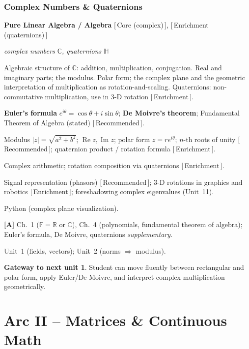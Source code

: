 \documentclass[11pt]{article}
\newcommand{\dom}[1]{{\sffamily\bfseries\color{RoyalBlue}#1}}
\newcommand{\pri}[1]{{\footnotesize\sffamily\color{BrickRed}[\,#1\,]}}
\newcommand{\obj}[1]{{\itshape #1}}
\newenvironment{unitfields}
  {\begin{description}[leftmargin=0pt,labelindent=0pt,style=nextline,
      font=\normalfont\sffamily\bfseries\color{RoyalBlue},itemsep=3pt,topsep=4pt]}
  {\end{description}}
\newcommand{\ff}[1]{\item[#1]}
\theoremstyle{definition}
\newtheorem*{gateway}{Gateway to next unit}
\begin{document}
\section{Complex Numbers \& Quaternions}
\begin{unitfields}
\ff{Domain(s)} \dom{Pure Linear Algebra / Algebra} \pri{Core (complex)}, \pri{Enrichment (quaternions)}
\ff{Primary object(s)} \obj{complex numbers $\mathbb{C}$, quaternions $\mathbb{H}$}
\ff{Topics}
  Algebraic structure of $\mathbb{C}$: addition, multiplication, conjugation.
  Real and imaginary parts; the modulus. Polar form; the complex plane and the
  geometric interpretation of multiplication as rotation-and-scaling.
  Quaternions: non-commutative multiplication, use in 3-D rotation
  \pri{Enrichment}.
\ff{Key theorems}
  \textbf{Euler's formula} $e^{i\theta}=\cos\theta+i\sin\theta$;
  \textbf{De Moivre's theorem}; Fundamental Theorem of Algebra (stated)
  \pri{Recommended}.
\ff{Tools / formulas}
  Modulus $|z|=\sqrt{a^2+b^2}$; $\operatorname{Re}z,\operatorname{Im}z$;
  polar form $z=re^{i\theta}$; $n$-th roots of unity \pri{Recommended};
  quaternion product / rotation formula \pri{Enrichment}.
\ff{Algorithms} Complex arithmetic; rotation composition via quaternions \pri{Enrichment}.
\ff{Applications}
  Signal representation (phasors) \pri{Recommended}; 3-D rotations in graphics
  and robotics \pri{Enrichment}; foreshadowing complex eigenvalues (Unit~11).
\ff{Languages} Python (complex plane visualization).
\ff{Textbook refs}
  \textbf{[A]} Ch.~1 ($\mathbb{F}=\mathbb{R}$ or $\mathbb{C}$),
  Ch.~4 (polynomials, fundamental theorem of algebra);
  Euler's formula, De Moivre, quaternions \emph{supplementary}.
\ff{ENTER} Unit~1 (fields, vectors); Unit~2 (norms $\Rightarrow$ modulus).
\end{unitfields}
\begin{gateway}
Student can move fluently between rectangular and polar form, apply Euler/De
Moivre, and interpret complex multiplication geometrically.
\end{gateway}

\part*{Arc II -- Matrices \& Continuous Math}

\end{document}
